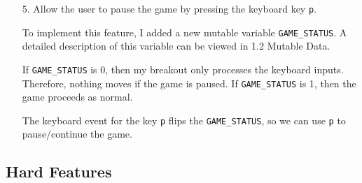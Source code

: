 \documentclass{article}
\newcommand{\code}[1]{\texttt{#1}}
\begin{document}
\begin{enumerate}
    \item[5.] Allow the user to pause the game by pressing the keyboard key \code{p}.
    
    To implement this feature, I added a new mutable variable \code{GAME\_STATUS}. A detailed description of this variable can be viewed in 1.2 Mutable Data. 

    If \code{GAME\_STATUS} is 0, then my breakout only processes the keyboard inputs. Therefore, nothing moves if the game is paused. If \code{GAME\_STATUS} is 1, then the game proceeds as normal.

    The keyboard event for the key \code{p} flips the \code{GAME\_STATUS}, so we can use \code{p} to pause/continue the game.
    
\end{enumerate}

\subsection{Hard Features}
\end{document}
